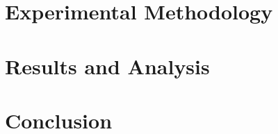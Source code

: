 \documentclass[journal=tches,final]{iacrtrans}
\begin{document}
\section{Experimental Methodology}\label{sec:methodology}

\section{Results and Analysis}\label{sec:results}

\section{Conclusion}\label{sec:conclusion}

\newpage



\end{document}
